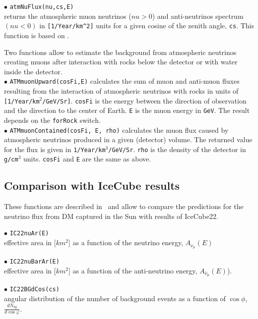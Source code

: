 \documentclass[12pt,a4paper]{article}
\begin{document}
\noindent $\bullet$ \verb|atmNuFlux(nu,cs,E)|\\
returns the atmospheric  muon neutrinos ($nu>0$) and anti-neutrinos spectrum
$(nu<0)$ in \verb|[1/Year/km^2]| units for a given cosine of the zenith angle, \verb|cs|. This function is  based on
\cite{Honda:2006qj}.   


Two functions allow to estimate the background from atmospheric neutrinos creating muons after interaction  with rocks below the detector  or with water inside the detector.\\
\noindent $\bullet$  \verb|ATMmuonUpward(cosFi,E)| calculates the sum of  muon
and anti-muon fluxes resulting from the
interaction of  atmospheric  neutrinos with rocks in units of  
\verb|[1/Year/km|$^2$\verb|/GeV/Sr]|. \verb|cosFi|  is the energy between the direction of
observation and the direction to the center of Earth. \verb|E|  is the  muon energy in
{\tt GeV}. The  result depends on  the {\tt forRock} switch. \\
\noindent $\bullet$  \verb|ATMmuonContained(cosFi, E, rho)| calculates the muon flux
caused by atmospheric  neutrinos  produced in a given (detector)
volume. The returned value for the flux is given in
\verb|1/Year/km|$^3$\verb|/GeV/Sr|. {\tt rho} is
the density of the detector in \verb|g/cm|$^3$ units. {\tt cosFi} and {\tt E} are the
same as above. 

\subsection{Comparison with IceCube results}


These functions are described in~\cite{Belanger:2015hra} and allow to compare the predictions for the neutrino flux from DM captured in the Sun with results of IceCube22.

\noindent
$\bullet$ \verb|IC22nuAr(E)|\\
effective area in [$km^2$] as a function of the neutrino energy, $A_{\nu_{\mu}}(E)$ 

\noindent$\bullet$ \verb|IC22nuBarAr(E)|\\
effective area in [$km^2$] as a function of the anti-neutrino energy, $A_{\bar{\nu}_{\mu}}(E)$).


\noindent
$\bullet$ \verb|IC22BGdCos(cs)| \\
angular distribution of the number of background events as a function of $\cos\phi$, $\frac{dN_{bg}}{d\cos{\varphi}}$.
  
\end{document}
